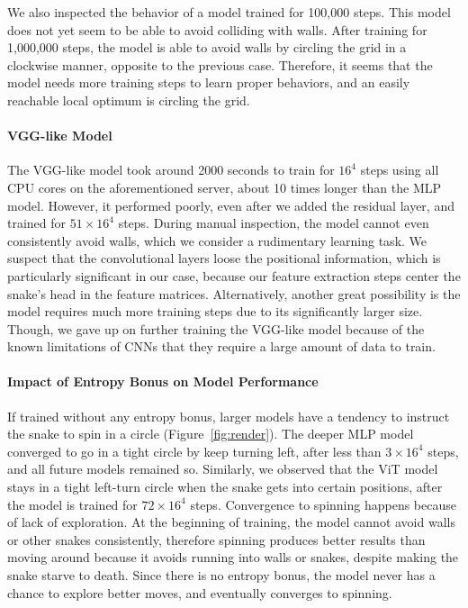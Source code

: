 \documentclass[conference]{IEEEtran}
\begin{document}
We also inspected the behavior of a model trained for 100,000 steps.
This model does not yet seem to be able to avoid colliding with walls.
After training for 1,000,000 steps,
the model is able to avoid walls by circling the grid in a clockwise manner,
opposite to the previous case. Therefore,
it seems that the model needs more training steps to learn proper behaviors,
and an easily reachable local optimum is circling the grid.

\paragraph{VGG-like Model}
The VGG-like model took around 2000 seconds to train for $16^4$ steps using all
CPU cores on the aforementioned server,
about 10 times longer than the MLP model. However, it performed poorly,
even after we added the residual layer, and trained for $51 \times 16^4$ steps.
During manual inspection, the model cannot even consistently avoid walls,
which we consider a rudimentary learning task.
We suspect that the convolutional layers loose the positional information,
which is particularly significant in our case,
because our feature extraction steps center the snake's head in the feature
matrices. Alternatively,
another great possibility is the model requires much more training steps due to
its significantly larger size. Though,
we gave up on further training the VGG-like model because of the known
limitations of CNNs that they require a large amount of data to train.

\paragraph{Impact of Entropy Bonus on Model Performance}
If trained without any entropy bonus,
larger models have a tendency to instruct the snake to spin in a circle
(Figure~\ref{fig:render}).
The deeper MLP model converged to go in a tight circle by keep turning left,
after less than $3\times 16^4$ steps, and all future models remained so.
Similarly,
we observed that the ViT model stays in a tight left-turn circle when the
snake gets into certain positions,
after the model is trained for $72\times 16^4$ steps.
Convergence to spinning happens because of lack of exploration.
At the beginning of training,
the model cannot avoid walls or other snakes consistently,
therefore spinning produces better results than moving around because it avoids
running into walls or snakes, despite making the snake starve to death.
Since there is no entropy bonus,
the model never has a chance to explore better moves,
and eventually converges to spinning.
\end{document}
